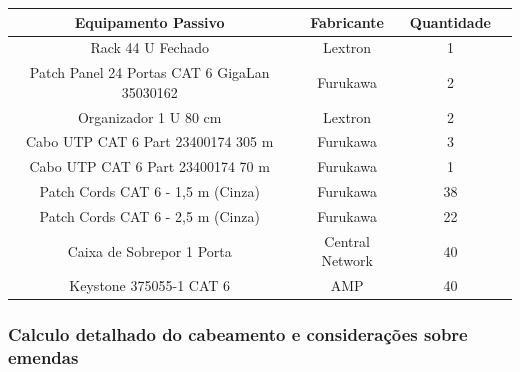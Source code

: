 \documentclass[	DIV=calc,%
							paper=a4,%
							fontsize=12pt,%
							onecolumn]{scrartcl}	 					%
\begin{document}
	

\begin{center}
	\renewcommand{\arraystretch}{1.5}
	\begin{tabular}{|c|c|c|c|}
		\hline
		\textbf{Equipamento Passivo}      & \textbf{Fabricante} & \multicolumn{1}{l|}{\textbf{Quantidade}} \\ \hline
		Rack 44 U Fechado                 & Lextron             & 1                                \\ \hline
		Patch Panel 24 Portas CAT 6 GigaLan 35030162     & Furukawa          & 2                                \\ \hline
		Organizador 1 U 80 cm            & Lextron             & 2                               \\ \hline
		Cabo UTP CAT 6 Part 23400174 305 m                  & Furukawa            & 3        \\ \hline
			Cabo UTP CAT 6 Part 23400174 70 m                  & Furukawa            & 1        \\ \hline
	
		Patch Cords CAT 6 - 1,5 m (Cinza) & Furukawa                 & 38                            \\ \hline
		Patch Cords CAT 6 - 2,5 m (Cinza) & Furukawa                 & 22                             \\ \hline
		Caixa de Sobrepor 1 Porta              & Central Network              & 40                             \\ \hline
		Keystone 375055-1
		 CAT 6                   & AMP              & 40                             \\ \hline
	\end{tabular}
\end{center}	

\vspace{1cm}

\subsubsection{Calculo detalhado do cabeamento e considerações sobre emendas}
\end{document}
